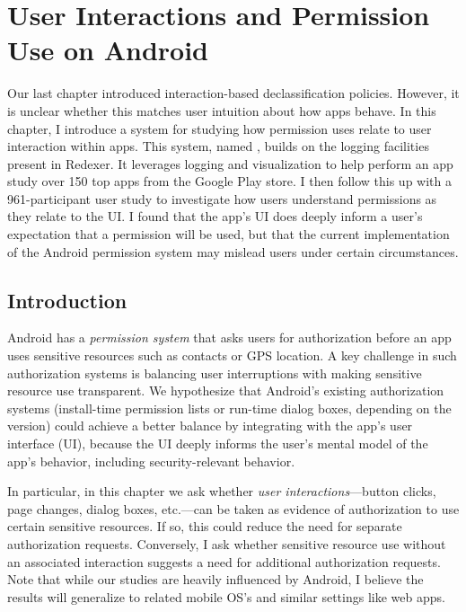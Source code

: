 \renewcommand{\thechapter}{4}

\chapter{User Interactions and Permission Use on Android}

Our last chapter introduced interaction-based declassification
policies. However, it is unclear whether this matches user intuition
about how apps behave. In this chapter, I introduce a system for
studying how permission uses relate to user interaction within
apps. This system, named \apptracer{}, builds on the logging
facilities present in Redexer. It leverages logging and visualization
to help perform an app study over 150 top apps from the Google Play
store. I then follow this up with a 961-participant user study to
investigate how users understand permissions as they relate to the
UI. I found that the app's UI does deeply inform a user's expectation
that a permission will be used, but that the current implementation of
the Android permission system may mislead users under certain
circumstances.

\section{Introduction}

Android has a \emph{permission system} that asks users for
authorization before an app uses sensitive resources such as
contacts or GPS location.
A key challenge in such authorization systems is balancing
user interruptions with making sensitive resource use transparent.
We hypothesize that Android's existing authorization systems
(install-time permission lists or run-time dialog boxes, depending
on the version) could achieve a better balance by integrating with the
app's user interface (UI), because the UI deeply informs the user's
mental model of the app's behavior, including security-relevant behavior.

In particular, in this chapter we ask whether \emph{user
  interactions}---button clicks, page changes, dialog boxes,
etc.---can be taken as evidence of authorization to use certain
sensitive resources. If so, this could reduce the need for separate
authorization requests. Conversely, I ask whether sensitive resource
use without an associated interaction suggests a need for additional
authorization requests.
Note that while our studies are heavily influenced by Android, I believe the
results will generalize to related mobile OS's and
similar settings like web apps.

